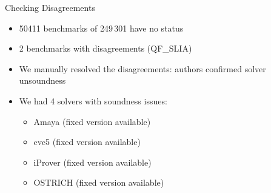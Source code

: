 \documentclass[table]{beamer}
\def\emph#1{\textcolor{MYblue}{#1}}
\newcommand\vitem{\vfill\item}
\begin{document}

\begin{frame}{Checking Disagreements}

  \begin{itemize}
  \item  50411 benchmarks of 249\,301 have no status

  \vitem 2 benchmarks with disagreements (QF\_SLIA)

  \vitem We manually resolved the disagreements: authors confirmed solver
  unsoundness
  \vitem We had 4 solvers with soundness issues:
    \begin{itemize}
      \item Amaya (fixed version available)
      \item cvc5 (fixed version available)
      \item iProver (fixed version available)
      \item OSTRICH (fixed version available)
    \end{itemize}
  \end{itemize}
  \end{frame}
\end{document}

